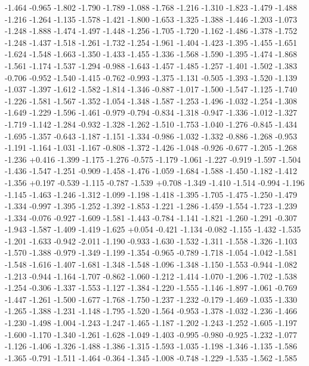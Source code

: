 \documentclass[9pt]{article}
\theoremstyle{plain}
\theoremstyle{definition}
\theoremstyle{remark}
\numberwithin{equation}{section}
\begin{document}
-1.464
-0.965
-1.802
-1.790
-1.789
-1.088
-1.768
-1.216
-1.310
-1.823
-1.479
-1.488
-1.216
-1.264
-1.135
-1.578
-1.421
-1.800
-1.653
-1.325
-1.388
-1.446
-1.203
-1.073
-1.248
-1.888
-1.474
-1.497
-1.448
-1.256
-1.705
-1.720
-1.162
-1.486
-1.378
-1.752
-1.248
-1.437
-1.518
-1.261
-1.732
-1.254
-1.961
-1.404
-1.423
-1.395
-1.455
-1.651
-1.624
-1.548
-1.663
-1.350
-1.433
-1.455
-1.336
-1.568
-1.590
-1.395
-1.474
-1.868
-1.561
-1.174
-1.537
-1.294
-0.988
-1.643
-1.457
-1.485
-1.257
-1.401
-1.502
-1.383
-0.706
-0.952
-1.540
-1.415
-0.762
-0.993
-1.375
-1.131
-0.505
-1.393
-1.520
-1.139
-1.037
-1.397
-1.612
-1.582
-1.814
-1.346
-0.887
-1.017
-1.500
-1.547
-1.125
-1.740
-1.226
-1.581
-1.567
-1.352
-1.054
-1.348
-1.587
-1.253
-1.496
-1.032
-1.254
-1.308
-1.649
-1.229
-1.596
-1.461
-0.979
-0.794
-0.834
-1.318
-0.947
-1.336
-1.012
-1.327
-1.719
-1.142
-1.284
-0.932
-1.328
-1.262
-1.510
-1.753
-1.040
-1.276
-0.845
-1.434
-1.695
-1.357
-0.643
-1.187
-1.151
-1.334
-0.986
-1.032
-1.332
-0.886
-1.268
-0.953
-1.191
-1.164
-1.031
-1.167
-0.808
-1.372
-1.426
-1.048
-0.926
-0.677
-1.205
-1.268
-1.236
+0.416
-1.399
-1.175
-1.276
-0.575
-1.179
-1.061
-1.227
-0.919
-1.597
-1.504
-1.436
-1.547
-1.251
-0.909
-1.458
-1.476
-1.059
-1.684
-1.588
-1.450
-1.182
-1.412
-1.356
+0.197
-0.539
-1.115
-0.787
-1.539
+0.708
-1.349
-1.410
-1.514
-0.994
-1.196
-1.145
-1.463
-1.246
-1.312
-1.099
-1.198
-1.418
-1.395
-1.705
-1.475
-1.250
-1.479
-1.334
-0.997
-1.395
-1.252
-1.392
-1.853
-1.221
-1.286
-1.459
-1.554
-1.723
-1.239
-1.334
-0.076
-0.927
-1.609
-1.581
-1.443
-0.784
-1.141
-1.821
-1.260
-1.291
-0.307
-1.943
-1.587
-1.409
-1.419
-1.625
+0.054
-0.421
-1.134
-0.082
-1.155
-1.432
-1.535
-1.201
-1.633
-0.942
-2.011
-1.190
-0.933
-1.630
-1.532
-1.311
-1.558
-1.326
-1.103
-1.570
-1.388
-0.979
-1.349
-1.199
-1.354
-0.965
-0.789
-1.718
-1.054
-1.042
-1.581
-1.548
-1.616
-1.407
-1.681
-1.348
-1.548
-1.096
-1.348
-1.150
-1.553
-0.944
-1.082
-1.213
-0.944
-1.164
-1.707
-0.862
-1.060
-1.212
-1.414
-1.070
-1.206
-1.702
-1.538
-1.254
-0.306
-1.337
-1.553
-1.127
-1.384
-1.220
-1.555
-1.146
-1.897
-1.061
-0.769
-1.447
-1.261
-1.500
-1.677
-1.768
-1.750
-1.237
-1.232
-0.179
-1.469
-1.035
-1.330
-1.265
-1.388
-1.231
-1.148
-1.795
-1.520
-1.564
-0.953
-1.378
-1.032
-1.236
-1.466
-1.230
-1.498
-1.004
-1.243
-1.247
-1.465
-1.187
-1.202
-1.243
-1.252
-1.605
-1.197
-1.600
-1.170
-1.340
-1.261
-1.628
-1.049
-1.403
-0.995
-0.980
-0.925
-1.232
-1.077
-1.126
-1.406
-1.326
-1.488
-1.386
-1.315
-1.593
-1.035
-1.198
-1.346
-1.135
-1.586
-1.365
-0.791
-1.511
-1.464
-0.364
-1.345
-1.008
-0.748
-1.229
-1.535
-1.562
-1.585
\end{document}
